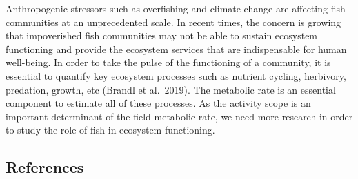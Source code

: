 \documentclass[12pt,a4paper]{article}
\begin{document}
\noindent Anthropogenic stressors such as overfishing and climate change
are affecting fish communities at an unprecedented scale. In recent
times, the concern is growing that impoverished fish communities may not
be able to sustain ecosystem functioning and provide the ecosystem
services that are indispensable for human well-being. In order to take
the pulse of the functioning of a community, it is essential to quantify
key ecosystem processes such as nutrient cycling, herbivory, predation,
growth, etc (Brandl et al.~2019). The metabolic rate is an essential
component to estimate all of these processes. As the activity scope is
an important determinant of the field metabolic rate, we need more
research in order to study the role of fish in ecosystem functioning.

\hypertarget{references}{%
\subsection{References}\label{references}}
\end{document}
